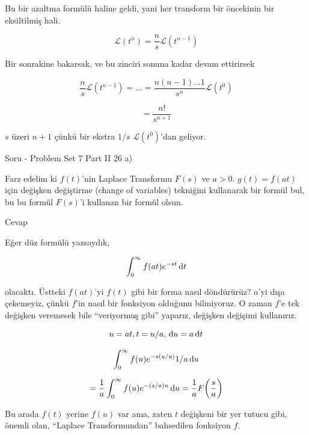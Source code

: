 \documentclass[12pt,fleqn]{article}\usepackage{../../common}
\begin{document}
Bu bir azaltma formülü haline geldi, yani her transform bir öncekinin bir
eksiltilmiş hali. 

$$ \mathcal{L} (t^n) = \frac{n}{s} \mathcal{L} (t^{n-1}) 
 $$

Bir sonrakine bakarsak, ve bu zinciri sonuna kadar devam ettirirsek

$$ \frac{n}{s} \mathcal{L} (t^{n-1}) = ... = 
\frac{n(n-1)...1 }{s^n}\mathcal{L}(t^0)
 $$

$$ = \frac{n!}{s^{n+1}} $$

$s$ üzeri $n+1$ çünkü bir ekstra $1/s$ $\mathcal{L} (t^0)$'dan geliyor. 

Soru - Problem Set 7 Part II 26 a) 

Farz edelim ki $f(t)$'nin Laplace Transformu $F(s)$ ve $a > 0$. $g(t) =
f(at)$ için değişken değiştirme (change of variables) tekniğini kullanarak bir formül
bul, bu bu formül $F(s)$'i kullanan bir formül olsun. 

Cevap 

Eğer düz formülü yazsaydık, 

$$ \int _{ 0}^{\infty} f(at) e^{ -st} \,\mathrm{d} t $$

olacaktı. Üstteki $f(at)$'yi $f(t)$ gibi bir forma nasıl döndürürüz? $a$'yi
dışa çekemeyiz, çünkü $f$'in nasıl bir fonksiyon olduğunu bilmiyoruz. O
zaman $f$'e tek değişken veremesek bile ``veriyormuş gibi'' yaparız,
değişken değişimi kullanırız. 

$$ u=at, t = u/a, \,\mathrm{d} u=a \,\mathrm{d} t $$

$$ \int _{ 0}^{\infty} f(u) e^{ -s(u/a)} 1/a \,\mathrm{d} u $$

$$
= \frac{ 1}{a}\int _{ 0}^{\infty} f(u) e^{ -(s/a)u} \,\mathrm{d} u  = 
\frac{ 1}{a}F \bigg(\frac{ s}{a} \bigg)
$$

Bu arada $f(t)$ yerine $f(u)$ var ama, zaten $t$ değişkeni bir yer tutucu
gibi, önemli olan, ``Laplace Transformundan'' bahsedilen fonksiyon $f$. 
\end{document}
